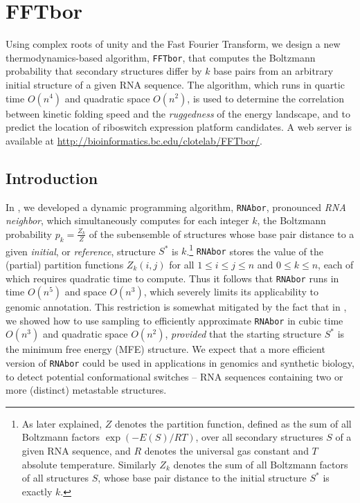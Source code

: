 
\chapter{FFTbor}

\label{FFTbor}


Using complex roots of unity and the Fast Fourier Transform, we
design a new thermodynamics-based algorithm, {\tt FFTbor}, that
computes the Boltzmann probability that secondary structures differ
by $k$ base pairs from an arbitrary initial structure of a given RNA
sequence. The algorithm, which runs in quartic time $O(n^4)$ and quadratic space
$O(n^2)$, is used to determine the
correlation between kinetic folding speed and the {\em ruggedness}
of the energy landscape, and to predict the location of riboswitch
expression platform candidates. A web server is available at
\url{http://bioinformatics.bc.edu/clotelab/FFTbor/}.

\section*{Introduction}

In \cite{Freyhult.b07}, we developed a dynamic programming algorithm,
{\tt RNAbor}, pronounced {\em RNA neighbor}, which simultaneously computes for
each integer $k$, the Boltzmann probability $p_k = \frac{Z_k}{Z}$
of the subensemble of structures
whose base pair distance to a given {\em initial}, or
{\em reference}, structure $S^*$ is $k$.\footnote{As later
explained, $Z$ denotes the partition function, defined as the sum of
all Boltzmann factors $\exp(-E(S)/RT)$, over all secondary structures $S$
of a given RNA sequence, and $R$ denotes the  universal
gas constant and $T$ absolute temperature. Similarly $Z_k$ denotes the
sum of all Boltzmann factors of all structures $S$, whose base pair distance
to the initial structure $S^*$ is exactly $k$.}
{\tt RNAbor} stores the value of the (partial)
partition functions $Z_k(i,j)$ for all $1 \leq i \leq j \leq n$ and
$0 \leq k \leq n$, each of which requires quadratic time to compute.
Thus it follows that {\tt RNAbor} runs in time $O(n^5)$ and space
$O(n^3)$, which severely limits its applicability to genomic annotation.
This restriction is somewhat mitigated by the fact that
in \cite{CloteLouLorenz}, we showed how to use sampling
\cite{Ding.nar03} to efficiently approximate
{\tt RNAbor} in cubic time $O(n^3)$ and quadratic space $O(n^2)$,
{\em provided} that the starting structure $S^*$ is the minimum free
energy (MFE) structure. We expect that a more efficient version of
{\tt RNAbor} could be used in applications in genomics and synthetic
biology, to detect potential conformational switches --
RNA sequences containing two or more (distinct) metastable structures.

